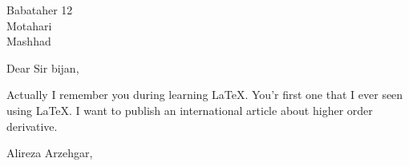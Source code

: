 \documentclass{letter}
\begin{document}
\begin{letter}{Babataher 12\\Motahari\\Mashhad}

\opening{Dear Sir bijan,}

Actually I remember you during learning \LaTeX. You'r first one that I ever seen using \LaTeX.
I want to publish an international article about higher order derivative.

\closing{Alireza Arzehgar,}
	
\end{letter}
\end{document}
